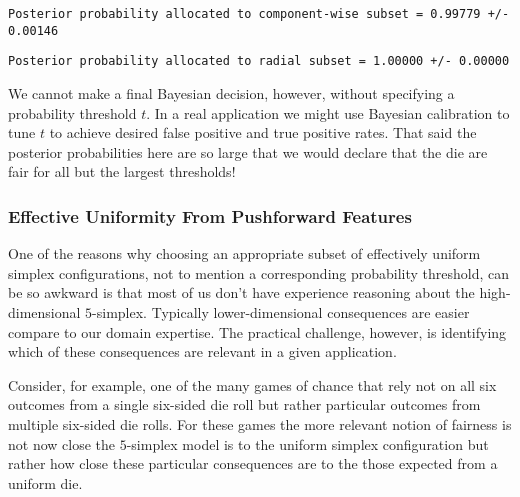 \documentclass[
  letterpaper,
  DIV=11,
  numbers=noendperiod]{scrartcl}
\newenvironment{Shaded}{\begin{snugshade}}{\end{snugshade}}
\newcommand{\DecValTok}[1]{\textcolor[rgb]{0.68,0.00,0.00}{#1}}
\newcommand{\FunctionTok}[1]{\textcolor[rgb]{0.28,0.35,0.67}{#1}}
\newcommand{\NormalTok}[1]{\textcolor[rgb]{0.00,0.23,0.31}{#1}}
\newcommand{\OtherTok}[1]{\textcolor[rgb]{0.00,0.23,0.31}{#1}}
\newcommand{\SpecialCharTok}[1]{\textcolor[rgb]{0.37,0.37,0.37}{#1}}
\newcommand{\StringTok}[1]{\textcolor[rgb]{0.13,0.47,0.30}{#1}}
\begin{document}
\begin{verbatim}
Posterior probability allocated to component-wise subset = 0.99779 +/- 0.00146
\end{verbatim}

\begin{Shaded}
\end{Shaded}

\begin{verbatim}
Posterior probability allocated to radial subset = 1.00000 +/- 0.00000
\end{verbatim}

We cannot make a final Bayesian decision, however, without specifying a
probability threshold \(t\). In a real application we might use Bayesian
calibration to tune \(t\) to achieve desired false positive and true
positive rates. That said the posterior probabilities here are so large
that we would declare that the die are fair for all but the largest
thresholds!

\subsubsection{Effective Uniformity From Pushforward
Features}\label{sec:effective_pushforward}

One of the reasons why choosing an appropriate subset of effectively
uniform simplex configurations, not to mention a corresponding
probability threshold, can be so awkward is that most of us don't have
experience reasoning about the high-dimensional \(5\)-simplex. Typically
lower-dimensional consequences are easier compare to our domain
expertise. The practical challenge, however, is identifying which of
these consequences are relevant in a given application.

Consider, for example, one of the many games of chance that rely not on
all six outcomes from a single six-sided die roll but rather particular
outcomes from multiple six-sided die rolls. For these games the more
relevant notion of fairness is not now close the \(5\)-simplex model is
to the uniform simplex configuration but rather how close these
particular consequences are to the those expected from a uniform die.
\end{document}
